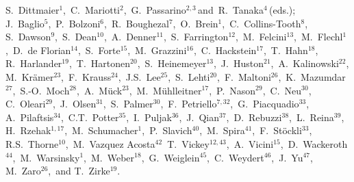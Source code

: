
\begin{flushleft}

S.~Dittmaier$^{1}$,\,
C.~Mariotti$^{2}$,\,
G.~Passarino$^{2,3}$\,and\,
R.~Tanaka$^{4}$\,(eds.);\\
J.~Baglio$^{5}$,\,
P.~Bolzoni$^{6}$,\,
R.~Boughezal$^{7}$,\, 
O.~Brein$^{1}$,\,
C.~Collins-Tooth$^{8}$,\,
S.~Dawson$^{9}$,\,
S.~Dean$^{10}$,\,
A.~Denner$^{11}$,\,
S.~Farrington$^{12}$,\, 
M.~Felcini$^{13}$,\,
M.~Flechl$^{1}$,\,
D.~de Florian$^{14}$,\,
S.~Forte$^{15}$,\,
M.~Grazzini$^{16}$,\, 
C.~Hackstein$^{17}$,\,
T.~Hahn$^{18}$,\, 
R.~Harlander$^{19}$,\,
T.~Hartonen$^{20}$,\,
S.~Heinemeyer$^{13}$,\,
J.~Huston$^{21}$,\,
A.~Kalinowski$^{22}$,\, 
M.~Kr\"amer$^{23}$,\,
F.~Krauss$^{24}$,\,
J.S.~Lee$^{25}$,\, 
S.~Lehti$^{20}$,\,
F.~Maltoni$^{26}$,\,
K.~Mazumdar$^{27}$,\,
S.-O.~Moch$^{28}$,\,
A.~M\"uck$^{23}$,\,
M.~M\"uhlleitner$^{17}$,\,
P.~Nason$^{29}$,\,
C.~Neu$^{30}$,\,
C.~Oleari$^{29}$,\,
J.~Olsen$^{31}$,\, 
S.~Palmer$^{30}$,\,
F.~Petriello$^{7,32}$,\,
G.~Piacquadio$^{33}$,\,
A.~Pilaftsis$^{34}$,\, 
C.T.~Potter$^{35}$,\,
I.~Puljak$^{36}$,\,
J.~Qian$^{37}$,\, 
D.~Rebuzzi$^{38}$,\,
L.~Reina$^{39}$,\,
H.~Rzehak$^{1,17}$,\,
M.~Schumacher$^{1}$,\,
P.~Slavich$^{40}$,\, 
M.~Spira$^{41}$,\,
F.~St\"ockli$^{33}$,\,
R.S.~Thorne$^{10}$,\,
M.~Vazquez Acosta$^{42}$\,
T.~Vickey$^{12,43}$,\,  
A.~Vicini$^{15}$,\,
D.~Wackeroth$^{44}$,\,
M.~Warsinsky$^{1}$,\,
M.~Weber$^{18}$,\,
G.~Weiglein$^{45}$,\, 
C.~Weydert$^{46}$,\, 
J.~Yu$^{47}$,\,
M.~Zaro$^{26}$,\,
and
T.~Zirke$^{19}$.
\end{flushleft}


